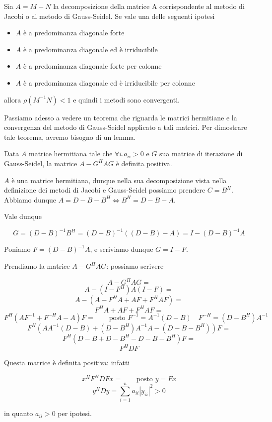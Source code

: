 \begin{theo}
Sia $A = M-N$ la decomposizione della matrice A corrispondente al
metodo di Jacobi o al metodo di Gauss-Seidel. Se vale una delle
seguenti ipotesi
\begin{itemize}
\item $A$ \`e a predominanza diagonale forte
\item $A$ \`e a predominanza diagonale ed \`e irriducibile
\item $A$ \`e a predominanza diagonale forte per colonne
\item $A$ \`e a predominanza diagonale ed \`e irriducibile per colonne
\end{itemize}
allora $\rho(M^{-1}N) <1$ e quindi i metodi sono convergenti.
\end{theo}





Passiamo adesso a vedere un teorema che riguarda le matrici hermitiane e la convergenza del metodo di Gauss-Seidel applicato a tali matrici. Per dimostrare tale teorema, avremo bisogno di un lemma.

\begin{lemma}\label{lem:aghag}
Data $A$  matrice hermitiana tale che $ \forall i.a_{ii} > 0 $ e $G$ sua matrice di iterazione di Gauss-Seidel, la matrice $ A - G^HAG $ \`e definita positiva.
\end{lemma}
\begin{thproof}
$A$ \`e una matrice hermitiana, dunque nella sua decomposizione vista nella definizione dei metodi di Jacobi e Gauss-Seidel possiamo prendere $ C = B^H $. Abbiamo dunque $ A = D - B - B^H \Leftrightarrow B^H = D - B - A $.

Vale dunque

 \[ G = (D-B)^{-1}B^H = (D-B)^{-1}((D - B) - A) = I - (D - B)^{-1}A \]
 
Poniamo $ F = (D - B)^{-1}A $, e scriviamo dunque $ G = I - F $.

Prendiamo la matrice $ A - G^HAG $: possiamo scrivere

\[ A - G^HAG = \]
\[ A - (I-F^H)A(I-F) = \]
\[ A - (A - F^HA + AF + F^HAF) = \]
\[ F^HA + AF + F^HAF = \]
\[ F^H(AF^{-1} + F^{-H}A - A)F = \qquad \text{posto } F^{-1}=A^{-1}(D-B) \quad F^{-H}=(D-B^{H})A^{-1} \]
\[ F^H(AA^{-1}(D-B) + (D-B^{H})A^{-1}A - (D - B - B^H))F = \]
\[ F^H(D - B + D - B^H - D - B - B^H)F = \]
\[ F^HDF\]

Questa matrice \`e definita positiva: infatti 

\[ x^HF^HDFx =  \qquad \text{posto } y = Fx\]
\[ y^HDy = \sum^{n}_{i=1}a_{ii}|y_{ii}|^2 >0\]

in quanto $ a_{ii} > 0 $ per ipotesi.
\end{thproof}

